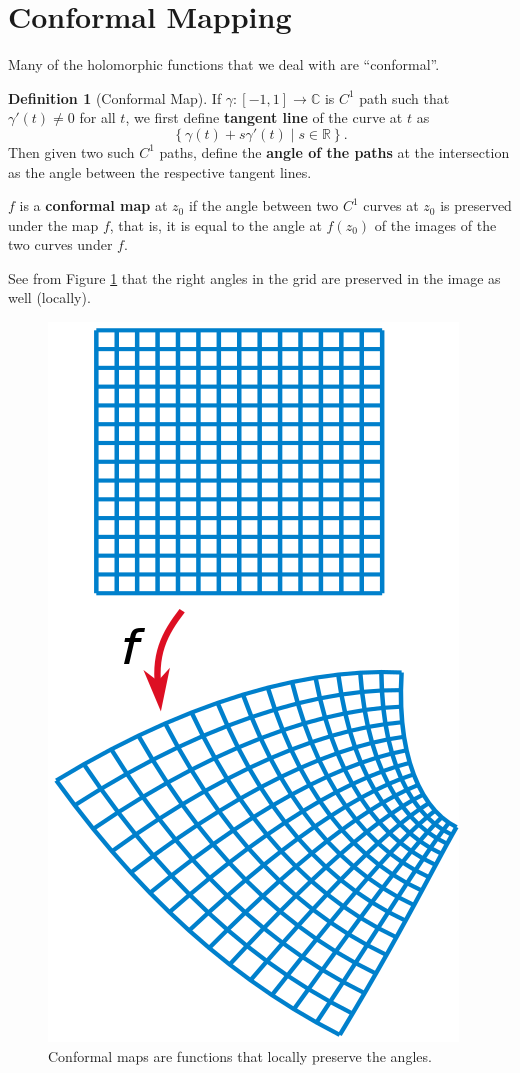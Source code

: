 \documentclass[a4paper, 12pt]{article}
\theoremstyle{definition}
\newtheorem{definition}{Definition}
\numberwithin{theorem}{section}
\numberwithin{definition}{section}
\numberwithin{exercise}{section}
\numberwithin{remark}{section}
\numberwithin{figure}{section}
\numberwithin{example}{section}
\newcommand{\R}{\mathbb{R}}
\newcommand{\C}{\mathbb{C}}
\begin{document}
\section{Conformal Mapping}
Many of the holomorphic functions that we deal with are ``conformal''.
\begin{definition}[Conformal Map]
    If $\gamma:[-1,1]\rightarrow \C$ is $C^1$ path such that $\gamma'(t) \neq 0$ for all $t$,
    we first define \textbf{tangent line} of the curve at $t$ as
    \begin{equation*}
        \left\{ \gamma(t) + s \gamma'(t) \middle| s \in \R \right\}.
    \end{equation*}
    Then given two such $C^1$ paths, define the \textbf{angle of the paths} at the intersection
    as the angle between the respective tangent lines.

    $f$ is a \textbf{conformal map} at $z_0$ if the angle between two $C^1$ curves at $z_0$
    is preserved under the map $f$, that is, it is equal to the angle at $f(z_0)$ of the images
    of the two curves under $f$.

    See from Figure \ref{fig: Conformal Map} that the right angles in the grid are preserved in the image as well (locally).
    \begin{figure}[tbp]
        \centering
        \includegraphics[scale=0.3]{ConformalMap}
        \caption{Conformal maps are functions that locally preserve the angles.}
        \label{fig: Conformal Map}
    \end{figure}
\end{definition}
\end{document}
